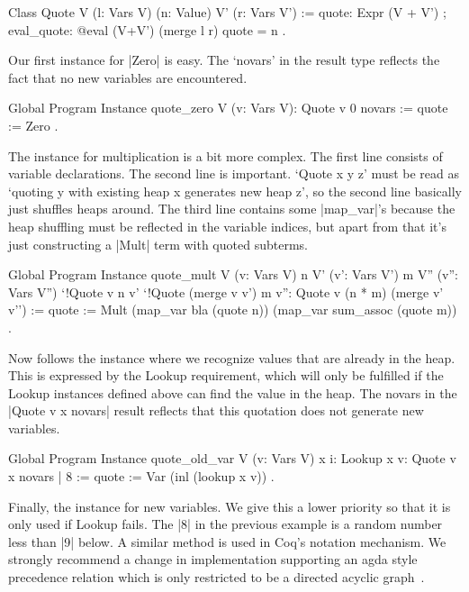 \documentclass[a4paper,10pt, runningheads]{llncs}
\begin{document}
\begin{code}
  Class Quote {V} (l: Vars V) (n: Value) {V'} (r: Vars V') :=
    { quote: Expr (V + V')
    ; eval_quote: @eval (V+V') (merge l r) quote = n }.
\end{code}

Our first instance for |Zero| is easy. The `novars' in the result type reflects the fact that no
new variables are encountered.
\begin{code}
  Global Program Instance quote_zero V (v: Vars V):
    Quote v 0 novars :=
  { quote := Zero }.
\end{code}

The instance for multiplication is a bit more complex. The first line consists of
 variable declarations. The second line is important. `Quote x y z' must be read as
 `quoting y with existing heap x generates new heap z', so the second line basically just
shuffles heaps around.
 The third line contains some |map_var|'s because the heap shuffling must be
reflected in the variable indices, but apart from that it's just constructing a |Mult| term with
quoted subterms.

\begin{code}
Global Program Instance quote_mult V (v: Vars V)
  n V' (v': Vars V') m V'' (v'': Vars V'')
  `{!Quote v n v'} `{!Quote (merge v v') m v''}:
  Quote v (n * m) (merge v' v'') :=
  { quote := Mult (map_var bla (quote n)) (map_var sum_assoc (quote m)) }.
\end{code}
  Now follows the instance where we recognize values that are already in the heap. This
   is expressed by the Lookup requirement, which will only be fulfilled if the Lookup instances
   defined above can find the value in the heap. The novars in the |Quote v x novars| result
   reflects that this quotation does not generate new variables.

\begin{code}
Global Program Instance quote_old_var
  V (v: Vars V) x {i: Lookup x v}:
  Quote v x novars | 8 := { quote := Var (inl (lookup x v)) }.
\end{code}

\noindent Finally, the instance for new variables. We give this a lower priority so that it is only
used if Lookup fails. The |8| in the previous example is a random number less than |9| below. A
similar method is used in Coq's notation mechanism. We strongly recommend a change in
implementation supporting an agda style precedence relation which is only restricted to be a
directed acyclic graph~\cite{danielsson2009parsing}.
\end{document}
